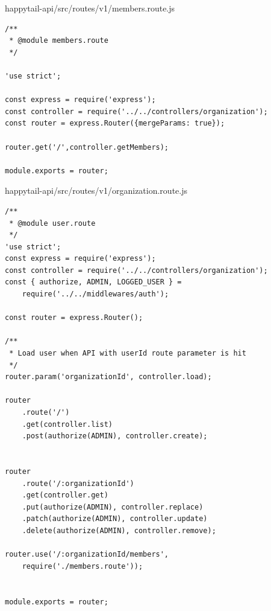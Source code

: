 \documentclass[12pt]{article}
\begin{document}
  \normalsize
 happytail-api/src/routes/v1/members.route.js
 \footnotesize
\begin{verbatim}
/**
 * @module members.route
 */

'use strict';

const express = require('express');
const controller = require('../../controllers/organization');
const router = express.Router({mergeParams: true});

router.get('/',controller.getMembers);

module.exports = router;

 \end{verbatim}
  \normalsize
 happytail-api/src/routes/v1/organization.route.js
 \footnotesize
\begin{verbatim}
/**
 * @module user.route
 */
'use strict';
const express = require('express');
const controller = require('../../controllers/organization');
const { authorize, ADMIN, LOGGED_USER } = 
	require('../../middlewares/auth');

const router = express.Router();

/**
 * Load user when API with userId route parameter is hit
 */
router.param('organizationId', controller.load);

router
    .route('/')
    .get(controller.list)
    .post(authorize(ADMIN), controller.create);


router
    .route('/:organizationId')
    .get(controller.get)
    .put(authorize(ADMIN), controller.replace)
    .patch(authorize(ADMIN), controller.update)
    .delete(authorize(ADMIN), controller.remove);

router.use('/:organizationId/members', 
	require('./members.route'));


module.exports = router;

 \end{verbatim}
 
\end{document}
